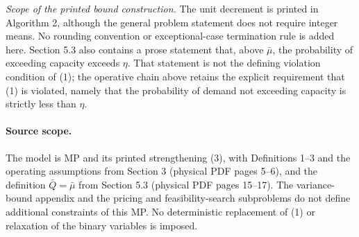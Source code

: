 \documentclass{article}
\begin{document}
\noindent\textit{Scope of the printed bound construction.} The unit decrement is printed in Algorithm 2, although the general problem statement does not require integer means. No rounding convention or exceptional-case termination rule is added here. Section 5.3 also contains a prose statement that, above $\bar\mu$, the probability of exceeding capacity exceeds $\eta$. That statement is not the defining violation condition of (1); the operative chain above retains the explicit requirement that (1) is violated, namely that the probability of demand not exceeding capacity is strictly less than $\eta$.

\paragraph{Source scope.}
The model is MP and its printed strengthening (3), with Definitions 1--3 and the operating assumptions from Section 3 (physical PDF pages 5--6), and the definition $\bar Q=\bar\mu$ from Section 5.3 (physical PDF pages 15--17). The variance-bound appendix and the pricing and feasibility-search subproblems do not define additional constraints of this MP. No deterministic replacement of (1) or relaxation of the binary variables is imposed.
\end{document}
